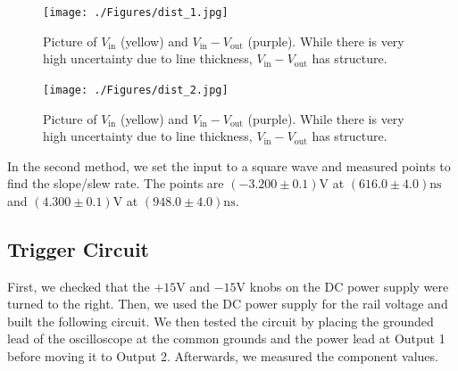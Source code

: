 \documentclass[11pt]{article}
\begin{document}
\begin{minipage}{0.45\textwidth}
	\begin{figure}[H]
		\centering
		\texttt{[image: ./Figures/dist\_1.jpg]}
		\caption{
			Picture of $V_\text{in}$ (yellow) and $V_\text{in} - V_\text{out}$ 
			(purple). While there is very high uncertainty due to line 
			thickness, $V_\text{in} - V_\text{out}$ has structure.
		}
	\end{figure}
\end{minipage}
\hspace{0.1\textwidth}
\begin{minipage}{0.45\textwidth}
	\begin{figure}[H]
		\centering
		\texttt{[image: ./Figures/dist\_2.jpg]}
		\caption{
			Picture of $V_\text{in}$ (yellow) and $V_\text{in} - V_\text{out}$ 
			(purple). While there is very high uncertainty due to line 
			thickness, $V_\text{in} - V_\text{out}$ has structure.
		}
	\end{figure}
\end{minipage}

In the second method, we set the input to a square wave and measured points to
find the slope/slew rate. The points are 
$(-3.200 \pm 0.1) \si{\volt}$ at $(616.0 \pm 4.0) \si{\nano\second}$ and
$(4.300 \pm 0.1) \si{\volt}$ at $(948.0 \pm 4.0) \si{\nano\second}$.

\subsection{Trigger Circuit}
\label{sec:trigger_data}

First, we checked that the $+15 \si{\volt}$ and $-15 \si{\volt}$ knobs on the 
DC power supply were turned to the right.
Then, we used the DC power supply for the rail voltage and built the following 
circuit. 
We then tested the circuit by placing the grounded lead 
of the oscilloscope at the common grounds and the power lead at Output 1 before
moving it to Output 2.
Afterwards, we measured the component values. 
\end{document}
